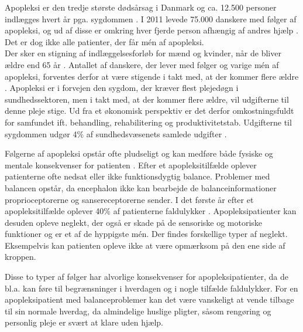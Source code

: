 Apopleksi er den tredje største dødsårsag i Danmark og ca. 12.500 personer indlægges hvert år pga. sygdommen \cite{Hjernesagen2015a}. %
I 2011 levede 75.000 danskere med følger af apopleksi, og ud af disse er omkring hver fjerde person afhængig af andres hjælp \cite{Hjernesagen2015a}. Det er dog ikke alle patienter, der får mén af apopleksi. \\
Der sker en stigning af indlæggelsesforløb for mænd og kvinder, når de bliver ældre end 65 år \cite{Sundhedsstyrelsen2011}. Antallet af danskere, der lever med følger og varige mén af apopleksi, forventes derfor at være stigende i takt med, at der kommer flere ældre \cite{Sagen2014}. Apopleksi er i forvejen den sygdom, der kræver flest plejedøgn i sundhedssektoren, men i takt med, at der kommer flere ældre, vil udgifterne til denne pleje stige. Ud fra et økonomisk perspektiv er det derfor omkostningsfuldt for samfundet ift. behandling, rehabilitering og produktivitetstab.  Udgifterne til sygdommen udgør 4\% af sundhedsvæsenets samlede udgifter \cite{Hjernesagen2015a, Kruuse2014}.
 
Følgerne af apopleksi opstår ofte pludseligt og kan medføre både fysiske og mentale konsekvenser for patienten \cite{Muus2008}. Efter et apopleksitilfælde oplever  patienterne ofte nedsat eller ikke funktionsdygtig balance. Problemer med balancen opstår, da encephalon ikke kan bearbejde de balanceinformationer proprioceptorerne og sansereceptorerne sender. \cite{Karnath2003} I det første år efter et apopleksitilfælde oplever 40\% af patienterne faldulykker \cite{Association2006}. 
Apopleksipatienter kan desuden opleve neglekt, der også er skade på de sensoriske og motoriske funktioner og er et af de hyppigste mén. Der findes forskellige typer af neglekt. Eksempelvis kan patienten opleve ikke at være opmærksom på den ene side af kroppen. \cite{Sundhed.dk} 

Disse to typer af følger har alvorlige konsekvenser for apopleksipatienter, da de bl.a. kan føre til begrænsninger i hverdagen og i nogle tilfælde faldulykker. \cite{Muus2008,Nichols1997} For en apopleksipatient med balanceproblemer kan det være vanskeligt at vende tilbage til sin normale hverdag, da almindelige huslige pligter, såsom rengøring og personlig pleje er svært at klare uden hjælp. \cite{Sundhedsstyrelsen2010}

